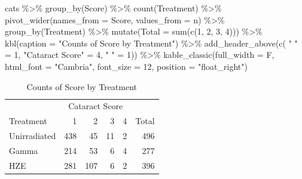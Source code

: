 \documentclass[
]{article}
\newenvironment{Shaded}{\begin{snugshade}}{\end{snugshade}}
\newcommand{\AttributeTok}[1]{\textcolor[rgb]{0.77,0.63,0.00}{#1}}
\newcommand{\DecValTok}[1]{\textcolor[rgb]{0.00,0.00,0.81}{#1}}
\newcommand{\FunctionTok}[1]{\textcolor[rgb]{0.00,0.00,0.00}{#1}}
\newcommand{\NormalTok}[1]{#1}
\newcommand{\OtherTok}[1]{\textcolor[rgb]{0.56,0.35,0.01}{#1}}
\newcommand{\SpecialCharTok}[1]{\textcolor[rgb]{0.00,0.00,0.00}{#1}}
\newcommand{\StringTok}[1]{\textcolor[rgb]{0.31,0.60,0.02}{#1}}
\begin{document}
\begin{Shaded}
\begin{Highlighting}[]
\NormalTok{cats }\SpecialCharTok{\%\textgreater{}\%} \FunctionTok{group\_by}\NormalTok{(Score) }\SpecialCharTok{\%\textgreater{}\%}
  \FunctionTok{count}\NormalTok{(Treatment) }\SpecialCharTok{\%\textgreater{}\%}
  \FunctionTok{pivot\_wider}\NormalTok{(}\AttributeTok{names\_from =}\NormalTok{ Score, }\AttributeTok{values\_from =}\NormalTok{ n) }\SpecialCharTok{\%\textgreater{}\%}
  \FunctionTok{group\_by}\NormalTok{(Treatment) }\SpecialCharTok{\%\textgreater{}\%}
  \FunctionTok{mutate}\NormalTok{(}\AttributeTok{Total =} \FunctionTok{sum}\NormalTok{(}\FunctionTok{c}\NormalTok{(}\StringTok{\textasciigrave{}}\AttributeTok{1}\StringTok{\textasciigrave{}}\NormalTok{, }\StringTok{\textasciigrave{}}\AttributeTok{2}\StringTok{\textasciigrave{}}\NormalTok{, }\StringTok{\textasciigrave{}}\AttributeTok{3}\StringTok{\textasciigrave{}}\NormalTok{, }\StringTok{\textasciigrave{}}\AttributeTok{4}\StringTok{\textasciigrave{}}\NormalTok{))) }\SpecialCharTok{\%\textgreater{}\%}
  \FunctionTok{kbl}\NormalTok{(}\AttributeTok{caption =} \StringTok{"Counts of Score by Treatment"}\NormalTok{) }\SpecialCharTok{\%\textgreater{}\%}
  \FunctionTok{add\_header\_above}\NormalTok{(}\FunctionTok{c}\NormalTok{( }\StringTok{" "} \OtherTok{=} \DecValTok{1}\NormalTok{, }\StringTok{"Cataract Score"} \OtherTok{=} \DecValTok{4}\NormalTok{, }\StringTok{" "} \OtherTok{=} \DecValTok{1}\NormalTok{)) }\SpecialCharTok{\%\textgreater{}\%}
  \FunctionTok{kable\_classic}\NormalTok{(}\AttributeTok{full\_width =}\NormalTok{ F, }\AttributeTok{html\_font =} \StringTok{"Cambria"}\NormalTok{, }\AttributeTok{font\_size =} \DecValTok{12}\NormalTok{, }\AttributeTok{position =} \StringTok{"float\_right"}\NormalTok{) }
\end{Highlighting}
\end{Shaded}

\begin{table}

\caption{\label{tab:scoregrps}Counts of Score by Treatment}
\centering
\fontsize{12}{14}\selectfont
\begin{tabular}[t]{l|r|r|r|r|r}
\hline
\multicolumn{1}{c|}{ } & \multicolumn{4}{c|}{Cataract Score} & \multicolumn{1}{c}{ } \\
\cline{2-5}
Treatment & 1 & 2 & 3 & 4 & Total\\
\hline
Unirradiated & 438 & 45 & 11 & 2 & 496\\
\hline
Gamma & 214 & 53 & 6 & 4 & 277\\
\hline
HZE & 281 & 107 & 6 & 2 & 396\\
\hline
\end{tabular}
\end{table}
\end{document}
